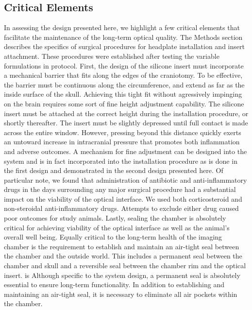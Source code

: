 \documentclass[../main.tex]{subfiles}
\begin{document}
\subsection{Critical Elements}
\label{sec:critical-elements}

In assessing the design presented here, we highlight a few critical elements that facilitate the maintenance of the long-term optical quality.
The Methods section describes the specifics of surgical procedures for headplate installation and insert attachment.
These procedures were established after testing the variable formulations in protocol.
First, the design of the silicone insert must incorporate a mechanical barrier that fits along the edges of the craniotomy.
To be effective, the barrier must be continuous along the circumference, and extend as far as the inside surface of the skull.
Achieving this tight fit without agressively impinging on the brain requires some sort of fine height adjustment capability.
The silicone insert must be attached at the correct height during the installation procedure, or shortly thereafter.
The insert must be slightly depressed until full contact is made across the entire window.
However, pressing beyond this distance quickly exerts an untoward increase in intracranial pressure that promotes both inflammation and adverse outcomes.
A mechanism for fine adjustment can be designed into the system and is in fact incorporated into the installation procedure as is done in the first design and demonstrated in the second design presented here.
Of particular note, we found that administration of antibiotic and anti-inflammatory drugs in the days surrounding any major surgical procedure had a substantial impact on the viability of the optical interface.
We used both corticosteroid and non-steroidal anti-inflammatory drugs.
Attempts to exclude either drug caused poor outcomes for study animals.
Lastly, sealing the chamber is absolutely critical for achieving viability of the optical interface as well as the animal’s overall well being.
Equally critical to the long-term health of the imaging chamber is the requirement to establish and maintain an air-tight seal between the chamber and the outside world.
This includes a permanent seal between the chamber and skull and a reversible seal between the chamber rim and the optical insert.
is Although specific to the system design, a permanent seal is absolutely essential to ensure long-term functionality.
In addition to establishing and maintaining an air-tight seal, it is necessary to eliminate all air pockets within the chamber.
\end{document}
